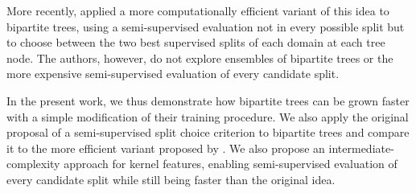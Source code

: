 More recently, \cite{alves2023semisupervised} applied a more computationally efficient variant of this idea to bipartite trees, using a semi-supervised evaluation not in every possible split but to choose between the two best supervised splits of each domain at each tree node. The authors, however, do not explore ensembles of bipartite trees or the more expensive semi-supervised evaluation of every candidate split.

In the present work, we thus demonstrate how bipartite trees can be grown faster with a simple modification of their training procedure. We also apply the original proposal of a semi-supervised split choice criterion to bipartite trees and compare it to the more efficient variant proposed by \cite{alves2023semisupervised}. We also propose an intermediate-complexity approach for kernel features, enabling semi-supervised evaluation of every candidate split while still being faster than the original idea. 


